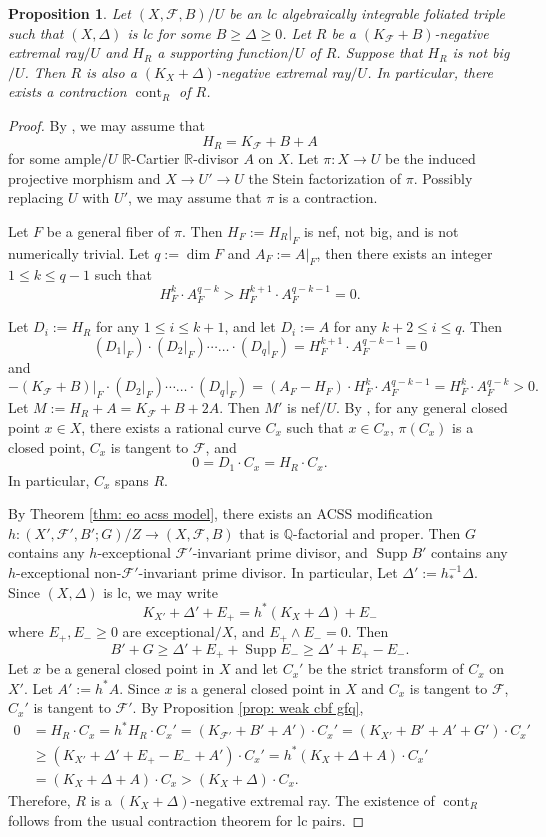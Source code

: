 \documentclass[11pt]{amsart}
\numberwithin{equation}{section}
\newcommand{\Qq}{\mathbb{Q}}
\newcommand{\Rr}{\mathbb{R}}
\newcommand{\Supp}{\operatorname{Supp}}
\newcommand{\cont}{\operatorname{cont}}
\newcommand{\Ff}{\mathcal{F}}
\newtheorem{prop}[thm]{Proposition}
\theoremstyle{definition}
\theoremstyle{definition}
\theoremstyle{definition}
\begin{document}
\begin{prop}\label{prop: contraction not big}
    Let $(X,\Ff,B)/U$ be an lc algebraically integrable foliated triple such that $(X,\Delta)$ is lc for some $B\geq\Delta\geq 0$. Let $R$ be a $(K_{\Ff}+B)$-negative extremal ray$/U$ and $H_R$ a supporting function$/U$ of $R$. Suppose that $H_R$ is not big$/U$. Then $R$ is also a $(K_X+\Delta)$-negative extremal ray$/U$. In particular, there exists a contraction $\cont_R$ of $R$. 
\end{prop}
\begin{proof}
By \cite[Theroem 2.2.1, Lemma 8.4.1]{CHLX23}, we may assume that 
       $$H_R=K_{\Ff}+B+A$$
for some ample$/U$ $\Rr$-Cartier $\Rr$-divisor $A$ on $X$. Let $\pi: X\rightarrow U$ be the induced projective morphism and $X\rightarrow U'\rightarrow U$ the Stein factorization of $\pi$. Possibly replacing $U$ with $U'$, we may assume that $\pi$ is a contraction. 

Let $F$ be a general fiber of $\pi$. Then $H_F:=H_R|_F$ is nef, not big, and is not numerically trivial. Let $q:=\dim F$ and $A_F:=A|_F$, then there exists an integer $1\leq k\leq q-1$ such that
$$H_F^k\cdot A_F^{q-k}>H_F^{k+1}\cdot A_F^{q-k-1}=0.$$

Let $D_i:=H_R$ for any $1\leq i\leq k+1$, and let $D_i:=A$ for any $k+2\leq i\leq q$. Then
$$(D_1|_F)\cdot (D_2|_F)\cdots\dots\cdot (D_q|_F)=H_F^{k+1}\cdot A_F^{q-k-1}=0$$
and
$$-(K_{\Ff}+B)|_F\cdot (D_2|_F)\cdots\dots\cdot (D_q|_F)=(A_F-H_F)\cdot H_F^{k}\cdot A_F^{q-k-1}=H_F^{k}\cdot A_F^{q-k}>0.$$
Let $M:=H_R+A=K_{\Ff}+B+2A$. Then $M'$ is nef$/U$. By \cite[Theorem 8.1.1]{CHLX23}, for any general closed point $x\in X$, there exists a rational curve $C_x$ such that $x\in C_x$, $\pi(C_x)$ is a closed point, $C_x$ is tangent to $\Ff$, and 
$$0=D_1\cdot C_x=H_R\cdot C_x.$$
In particular, $C_x$ spans $R$.

By Theorem \ref{thm: eo acss model}, there exists an  ACSS modification $h: (X',\Ff',B';G)/Z\rightarrow (X,\Ff,B)$ that is $\Qq$-factorial and proper. Then $G$ contains any $h$-exceptional $\Ff'$-invariant prime divisor, and $\Supp B'$ contains any $h$-exceptional non-$\Ff'$-invariant prime divisor. In particular, Let $\Delta':=h^{-1}_*\Delta$. Since $(X,\Delta)$ is lc, we may write
    $$K_{X'}+\Delta'+E_+=h^*(K_X+\Delta)+E_-$$
    where $E_+,E_-\geq 0$ are exceptional$/X$, and $E_+\wedge E_-=0$. Then
 $$B'+G\geq \Delta'+E_++\Supp E_-\geq \Delta'+E_+-E_-.$$
Let $x$ be a general closed point in $X$ and let $C_x'$ be the strict transform of $C_x$ on $X'$. Let $A':=h^*A$. Since $x$ is a general closed point in $X$ and $C_x$ is tangent to $\Ff$, $C_x'$ is tangent to $\Ff'$. By Proposition \ref{prop: weak cbf gfq},
\begin{align*}
0&=H_R\cdot C_x=h^*H_R\cdot C_x'=(K_{\Ff'}+B'+A')\cdot C_x'=(K_{X'}+B'+A'+G')\cdot C_x'\\
&\geq (K_{X'}+\Delta'+E_+-E_-+A')\cdot C_x'=h^*(K_X+\Delta+A)\cdot C_x'\\
&=(K_X+\Delta+A)\cdot C_x>(K_X+\Delta)\cdot C_x.
\end{align*}
Therefore, $R$ is a $(K_X+\Delta)$-negative extremal ray. The existence of $\cont_R$ follows from the usual contraction theorem for lc pairs. 
\end{proof}
\end{document}
